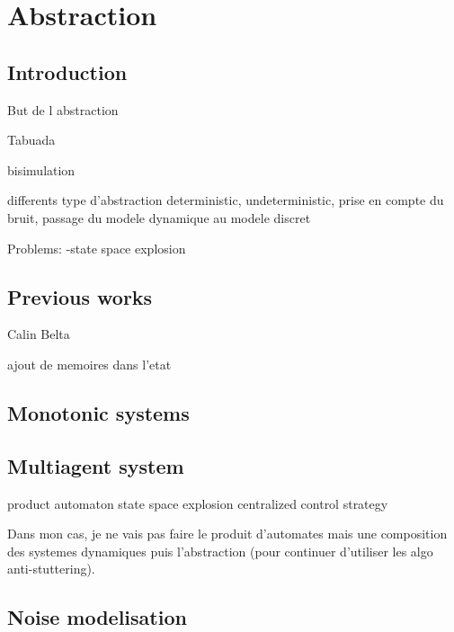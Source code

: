 \documentclass{report}
\begin{document}
\chapter*{Abstraction}

\section*{Introduction}

But de l abstraction

Tabuada

bisimulation

differents type d'abstraction
deterministic, undeterministic, prise en compte du bruit, passage du modele dynamique au modele discret

Problems:
-state space explosion


\section*{Previous works}

Calin Belta

ajout de memoires dans l'etat

\section*{Monotonic systems}


\section*{Multiagent system}
product automaton
state space explosion 
centralized control strategy

Dans mon cas, je ne vais pas faire le produit d'automates mais une composition des systemes dynamiques puis l'abstraction (pour continuer d'utiliser les algo anti-stuttering).

\section*{Noise modelisation}
\end{document}
